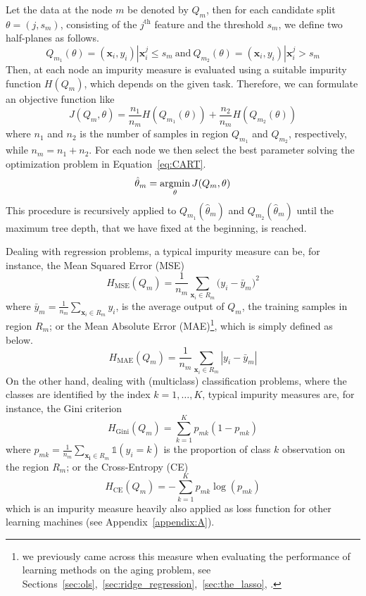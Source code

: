 		Let the data at the node $m$ be denoted by $Q_m$, then for each candidate split $\theta=(j, s_m)$, consisting of the $j^{\text{th}}$ feature and the threshold $s_m$, we define two half-planes as follows.
		$$
		Q_{m_1}(\theta) = (\bm{x}_i, y_i) | \bm{x}_i^j \leq s_m~\text{and}~Q_{m_2}(\theta) = (\bm{x}_i, y_i) | \bm{x}_i^j > s_m
		$$
		Then, at each node an impurity measure is evaluated using a suitable impurity function $H(Q_m)$, which depends on the given task. Therefore, we can formulate an objective function like
		$$
		J(Q_m,\theta) = \frac{n_1}{n_m}H(Q_{m_1}(\theta)) + \frac{n_2}{n_m}H(Q_{m_2}(\theta))
		$$
		where $n_1$ and $n_2$ is the number of samples in region $Q_{m_1}$ and $Q_{m_2}$, respectively, while $n_m=n_1+n_2$.
		For each node we then select the best parameter solving the optimization problem in Equation~\eqref{eq:CART}.
		\begin{equation} \label{eq:CART}
			\hat \theta_m = \mathop{\mathrm{argmin}}\limits_{\theta} J(Q_m,\theta)
		\end{equation}
		This procedure is recursively applied to $Q_{m_1}(\hat \theta_m)$ and $Q_{m_2}(\hat \theta_m)$ until the maximum tree depth, that we have fixed at the beginning, is reached.
		
		Dealing with regression problems, a typical impurity measure can be, for instance, the Mean Squared Error (\ac{MSE})
		\begin{equation} \label{eq:MSE}
			H_{\text{MSE}}(Q_m) = \frac{1}{n_m} \sum_{\bm{x}_i \in R_m} \big(y_i - \bar y_m \big)^2
		\end{equation}
		where $\bar y_m = \frac{1}{n_m} \sum_{\bm{x}_i \in R_m} y_i$, is the average output of $Q_m$, \ie the training samples in region $R_m$;
		or the Mean Absolute Error (\ac{MAE})\footnote{we previously came across this measure when evaluating the performance of learning methods on the aging problem, see Sections~\ref{sec:ols},~\ref{sec:ridge_regression},~\ref{sec:the_lasso}, \etc.}, which is simply defined as below.
		\begin{equation} \label{eq:MAE}
				H_{\text{MAE}}(Q_m) = \frac{1}{n_m} \sum_{\bm{x}_i \in R_m} | y_i - \bar y_m |
		\end{equation}
		On the other hand, dealing with (multiclass) classification problems, where the classes are identified by the index $k=1,\dots,K$, typical impurity measures are, for instance, the Gini criterion
		\begin{equation} \label{eq:gini}
			H_{\text{Gini}}(Q_m) = \sum_{k=1}^K p_{mk}(1-p_{mk})
		\end{equation}
		where $p_{mk}=\frac{1}{n_m} \sum_{\bm{x_i} \in R_m} \mathds{1}(y_i = k)$ is the proportion of class $k$ observation on the region $R_m$; or the Cross-Entropy (\ac{CE})
		\begin{equation} \label{eq:ce}
			H_{\text{CE}}(Q_m) = - \sum_{k=1}^K p_{mk} \log(p_{mk})
		\end{equation}
		which is an impurity measure heavily also applied as loss function for other  learning machines (see Appendix~\ref{appendix:A}).
		
